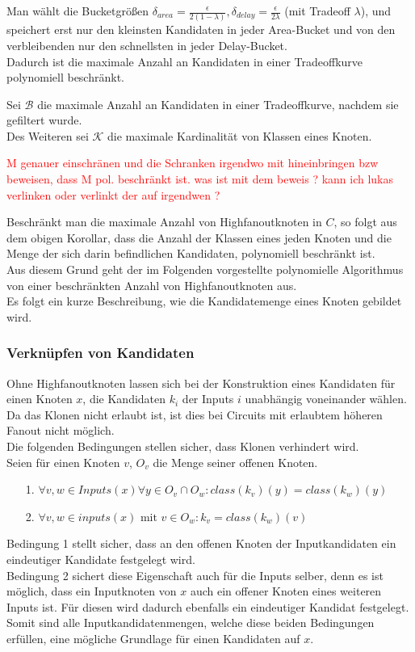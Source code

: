 \documentclass[11pt, a4paper, german]{article}
\begin{document}
Man wählt die Bucketgrößen $\delta_{area} = \frac{\epsilon}{2(1-\lambda)}, \delta_{delay} = \frac{\epsilon}{2\lambda}$ (mit Tradeoff $\lambda$), und speichert erst nur den kleinsten Kandidaten in jeder Area-Bucket und von den verbleibenden nur den schnellsten in jeder Delay-Bucket.\\
Dadurch ist die maximale Anzahl an Kandidaten in einer Tradeoffkurve polynomiell beschränkt. 
\begin{definition}
Sei $\mathcal{B}$ die maximale Anzahl an Kandidaten in einer Tradeoffkurve, nachdem sie gefiltert wurde.\\
Des Weiteren sei $\mathcal{K}$ die maximale Kardinalität von Klassen eines Knoten.
\end{definition}
\textcolor{red}{M genauer einschränen und die Schranken irgendwo mit hineinbringen bzw beweisen, dass M pol. beschränkt ist. }
\textcolor{red}{was ist mit dem beweis ? kann ich lukas verlinken oder verlinkt der auf irgendwen ?}

Beschränkt man die maximale Anzahl von Highfanoutknoten in $C$, so folgt aus dem obigen Korollar, dass die Anzahl der Klassen eines jeden Knoten und die Menge der sich darin befindlichen Kandidaten, polynomiell beschränkt ist. \\
Aus diesem Grund geht der im Folgenden vorgestellte polynomielle Algorithmus von einer beschränkten Anzahl von Highfanoutknoten aus.\\ 

Es folgt ein kurze Beschreibung, wie die Kandidatemenge eines Knoten gebildet wird.

\subsubsection{Verknüpfen von Kandidaten}
Ohne Highfanoutknoten lassen sich bei der Konstruktion eines Kandidaten für einen Knoten $x$, die Kandidaten $k_i$ der Inputs $i$ unabhängig voneinander wählen.
Da das Klonen nicht erlaubt ist, ist dies bei Circuits mit erlaubtem höheren Fanout nicht möglich.\\
Die folgenden Bedingungen stellen sicher, dass Klonen verhindert wird. \\
Seien für einen Knoten $v$, $O_v$ die Menge seiner offenen Knoten.
\begin{itemize}
	\item[1.] $\forall v,w \in Inputs(x) \forall y \in O_v \cap O_w : class(k_v)(y) = class(k_w)(y)$
	\item[2.] $\forall v,w \in inputs(x) \text{ mit } v \in O_w : k_v = class(k_w)(v)$
\end{itemize}
Bedingung 1 stellt sicher, dass an den offenen Knoten der Inputkandidaten ein eindeutiger Kandidate festgelegt wird.\\ Bedingung 2 sichert diese Eigenschaft auch für die Inputs selber, denn es ist möglich, dass ein Inputknoten von $x$ auch ein offener Knoten eines weiteren Inputs ist. Für diesen wird dadurch ebenfalls ein eindeutiger Kandidat festgelegt. \\
Somit sind alle Inputkandidatenmengen, welche diese beiden Bedingungen erfüllen, eine mögliche Grundlage für einen Kandidaten auf $x$. 
\end{document}
